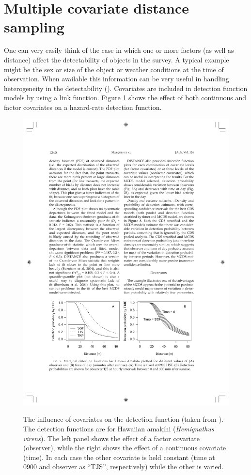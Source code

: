 \section{Multiple covariate distance sampling}
\label{intro-ds-covar}

One can very easily think of the case in which one or more factors (as well as distance) affect the detectability of objects in the survey. A typical example might be the sex or size of the object or weather conditions at the time of observation. When available this information can be very useful in handling heterogeneity in the detectability (\cite[p. 88]{IDS}). Covariates are included in detection function models by using a link function. Figure \ref{ds-covarex} shows the effect of both continuous and factor covariates on a hazard-rate detection function.

\begin{figure}
\centering
\includegraphics{intro/figs/amakihi-detfct.pdf}\\
\caption{The influence of covariates on the detection function (taken from \cite{amakihi}). The detection functions are for Hawaiian amakihi (\textit{Hemignathus virens}). The left panel shows the effect of a factor covariate (observer), while the right shows the effect of a continuous covariate (time). In each case the other covariate is held constant (time at $0900$ and observer as ``TJS'', respectively) while the other is varied.}
\label{ds-covarex}
\end{figure}

